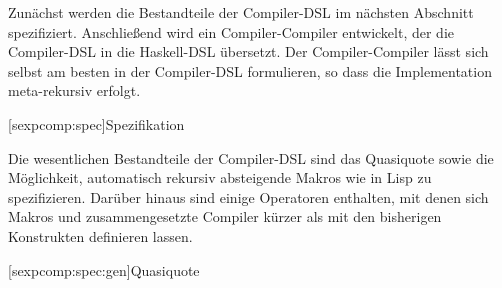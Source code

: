\documentclass[12pt, a4paper, bibgerm]{scrbook}
\newcommand\lsection{}
\newcommand\lsubsection{}
\begin{document}
Zunächst werden die Bestandteile der Compiler-DSL im nächsten Abschnitt
spezifiziert. Anschließend wird ein Compiler-Compiler entwickelt, der
die Compiler-DSL in die Haskell-DSL übersetzt. Der Compiler-Compiler lässt sich
selbst am besten in der Compiler-DSL formulieren, so dass die
Implementation meta-rekursiv erfolgt.

\lsection[sexpcomp:spec]{Spezifikation}

Die wesentlichen Bestandteile der Compiler-DSL sind das Quasiquote sowie
die Möglichkeit, automatisch rekursiv absteigende Makros wie in Lisp zu
spezifizieren. Darüber hinaus sind einige Operatoren enthalten, mit
denen sich Makros und zusammengesetzte Compiler kürzer als mit den
bisherigen Konstrukten definieren lassen.

\lsubsection[sexpcomp:spec:gen]{Quasiquote}
\end{document}
